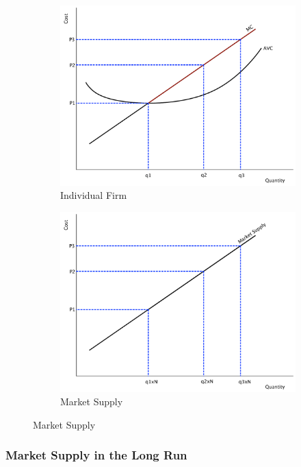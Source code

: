 \documentclass[11pt]{article}\usepackage[]{graphicx}\usepackage[]{color}
\theoremstyle{definition}
\begin{document}
	
	\begin{figure}[H]
		\centering
		\caption{Short-run Market Supply}
		\begin{subfigure}{.5\textwidth}
			\includegraphics[scale=.3]{plot66.pdf}
			\caption{Individual Firm}
		\end{subfigure}%
		\begin{subfigure}{.5\textwidth}
			\centering
			\includegraphics[scale=.3]{plot67.pdf}
			\caption{Market Supply}
		\end{subfigure}
	\end{figure}
	
	\subsubsection*{Market Supply in the Long Run}
	
\end{document}
